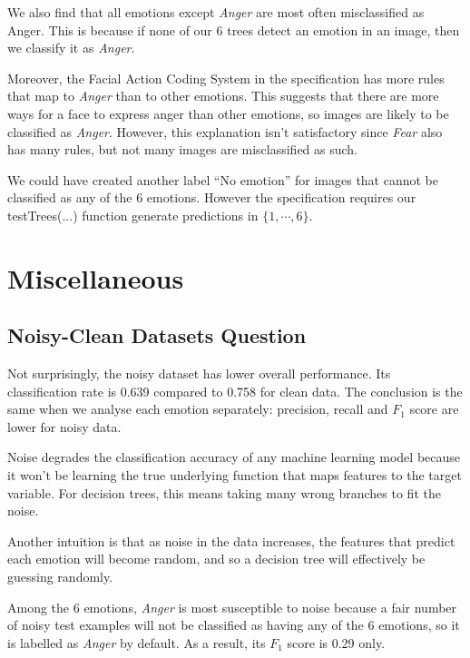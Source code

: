 \documentclass[12pt, a4paper]{article}
\begin{document}
\bigskip
We also find that all emotions except \textit{Anger} are most often misclassified as Anger. This is because if none of our 6 trees detect an emotion in an image, then we classify it as \textit{Anger}.\par
\bigskip
Moreover, the Facial Action Coding System in the specification has more rules that map to \textit{Anger} than to other emotions. This suggests that there are more ways for a face to express anger than other emotions, so images are likely to be classified as \textit{Anger}. However, this explanation isn't satisfactory since \textit{Fear} also has many rules, but not many images are misclassified as such.\par
\bigskip
We could have created another label ``No emotion'' for images that cannot be classified as any of the 6 emotions. However the specification requires our testTrees(...) function generate predictions in $\{1, \dotsm, 6\}$.

\section*{Miscellaneous}
\subsection*{Noisy-Clean Datasets Question}
Not surprisingly, the noisy dataset has lower overall performance. Its classification rate is 0.639 compared to 0.758 for clean data. The conclusion is the same when we analyse each emotion separately: precision, recall and $F_1$ score are lower for noisy data.\par
\bigskip
Noise degrades the classification accuracy of any machine learning model because it won't be learning the true underlying function that maps features to the target variable. For decision trees, this means taking many wrong branches to fit the noise.\par
\bigskip
Another intuition is that as noise in the data increases, the features that predict each emotion will become random, and so a decision tree will effectively be guessing randomly.\par
\bigskip
Among the 6 emotions, \textit{Anger} is most susceptible to noise because a fair number of noisy test examples will not be classified as having any of the 6 emotions, so it is labelled as \textit{Anger} by default. As a result, its $F_1$ score is 0.29 only.\par
\end{document}
